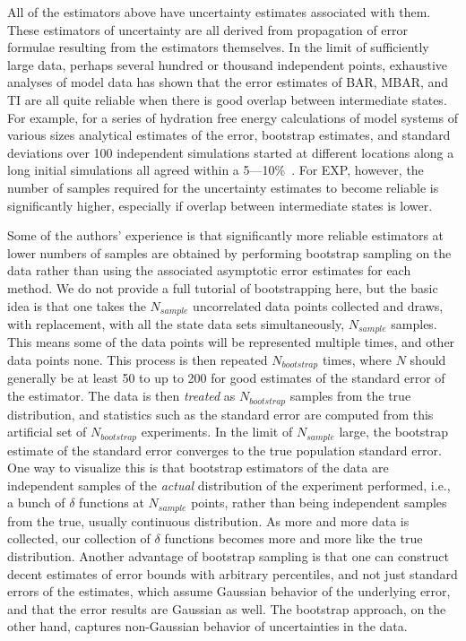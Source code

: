 All of the estimators above have uncertainty estimates associated with them. These estimators of uncertainty are all derived from propagation of error formulae resulting from the estimators themselves.  In the limit of sufficiently large data, perhaps several hundred or thousand independent points, exhaustive analyses of model data has shown that the error estimates of BAR, MBAR, and TI are all quite reliable when there is good overlap between intermediate states. For example, for a series of hydration free energy calculations of model systems of various sizes analytical estimates of the error, bootstrap estimates, and standard deviations over 100 independent simulations started at different locations along a long initial simulations all agreed within a 5---10\%~\cite{paliwal2011benchmark}. For EXP, however, the number of samples required for the uncertainty estimates to become reliable is significantly higher, especially if overlap between intermediate states is lower. 


Some of the authors' experience is that significantly more reliable estimators at lower numbers of samples are obtained by performing bootstrap sampling on the data rather than using the associated asymptotic error estimates for each method. We do not provide a full tutorial of bootstrapping here, but the basic idea is that one takes the $N_{sample}$ uncorrelated data points collected and draws, with replacement, with all the state data sets simultaneously, $N_{sample}$ samples.  This means some of the data points will be represented multiple times, and other data points none. This process is then repeated $N_{bootstrap}$ times, where $N$ should generally be at least 50 to up to 200 for good estimates of the standard error of the estimator.  The data is then \textit{treated} as $N_{bootstrap}$ samples from the true distribution, and statistics such as the standard error are computed from this artificial set of $N_{bootstrap}$ experiments.  In the limit of $N_{sample}$ large, the bootstrap estimate of the standard error converges to the true population standard error.  One way to visualize this is that bootstrap estimators of the data are independent samples of the \textit{actual} distribution of the experiment performed, i.e., a bunch of $\delta$ functions at $N_{sample}$ points, rather than being independent samples from the true, usually continuous distribution.  As more and more data is collected, our collection of $\delta$ functions becomes more and more like the true distribution. Another advantage of bootstrap sampling is that one can construct decent estimates of error bounds with arbitrary percentiles, and not just standard errors of the estimates, which assume Gaussian behavior of the underlying error, and that the error results are Gaussian as well.  The bootstrap approach, on the other hand, captures non-Gaussian behavior of uncertainties in the data. 

